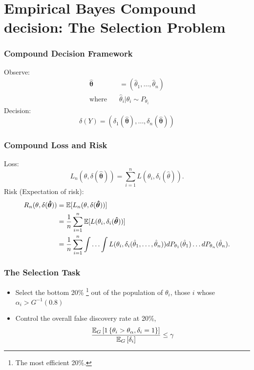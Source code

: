 \documentclass[10pt,mathserif]{beamer}
\begin{document}
\section{Empirical Bayes Compound decision: The Selection Problem}

\begin{frame}
  \frametitle{Compound Decision Framework}
  Observe:
  \begin{align*}
    \boldsymbol{\hat{\theta}} & =  (\hat{\theta}_1,\ldots, \hat{\theta}_n)  \\
    \text{where} \quad        & \hat{\theta}_i | \theta_i \sim P_{\theta_i}
  \end{align*}
  Decision:
  \begin{equation*}
    \delta(Y) = (\delta_1(\boldsymbol{\hat{\theta}}), \ldots, \delta_n(\boldsymbol{\hat{\theta}}))
  \end{equation*}
\end{frame}

\begin{frame}
  \frametitle{Compound Loss and Risk}
  Loss:
  \begin{equation*}
    L_n(\theta, \delta(\boldsymbol{\hat{\theta}})) = \sum_{i=1}^n L(\theta_i, \delta_i(\hat{\theta})).
  \end{equation*}
  Risk (Expectation of risk):
  \begin{align*}
    R_n(\theta, \delta(\boldsymbol{\hat{\theta}})) & = \mathbb{E}[L_n(\theta, \delta(\boldsymbol{\hat{\theta}}))]                                                                                                                       \\
                                                   & = \frac{1}{n}\sum_{i=1}^n \mathbb{E}[L(\theta_i, \delta_i(\boldsymbol{\hat{\theta}}))]                                                                                             \\
                                                   & = \frac{1}{n}\sum_{i=1}^n \int \ldots \int L(\theta_i, \delta_i(\hat{\theta}_1, \ldots, \hat{\theta}_n))dP_{\theta_1}(\hat{\theta}_1)\ldots dP_{\theta_n}(\hat{\theta}_n). \\
  \end{align*}

\end{frame}

\begin{frame}
  \frametitle{The Selection Task}
  \begin{itemize}\itemsep=12pt
    \item Select the bottom 20\% \footnote{The most efficient 20\%.} out of the
          population of $\theta_i$, those $i$ whose $\alpha_i>G^{-1}(0.8)$
    \item Control the overall false discovery rate at 20\%, \begin{equation*}
            \frac{\mathbb{E}_G\left[1\left\{\theta_i>\theta_{\alpha},\delta_i=1\right\}\right]}{\mathbb{E}_G\left[\delta_i\right]} \le \gamma
          \end{equation*}
  \end{itemize}
\end{frame}
\end{document}
